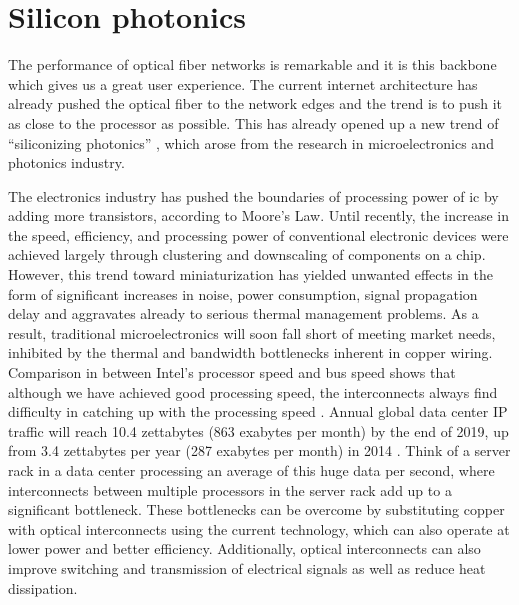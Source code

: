 \documentclass[../report.tex]{subfiles}
\begin{document}
	\section{Silicon photonics}
The performance of optical fiber networks is remarkable and it is this backbone which gives us a great user experience. The current internet architecture has already pushed the optical fiber to the network edges and the trend is to push it as close to the processor as possible. This has already opened up a new trend of “siliconizing photonics” \cite{silicon_photonics}, which arose from the research in microelectronics and photonics industry.\par 
The electronics industry has pushed the boundaries of processing power of \gls{ic} by adding more transistors, according to Moore’s Law. Until recently, the increase in the speed, efficiency, and processing power of conventional electronic devices were achieved largely through clustering and downscaling of components on a chip. However, this trend toward miniaturization has yielded unwanted effects in the form of significant increases in noise, power consumption, signal propagation delay and aggravates already to serious thermal management problems. As a result, traditional microelectronics will soon fall short of meeting market needs, inhibited by the thermal and bandwidth bottlenecks inherent in copper wiring. Comparison in between Intel's processor speed and bus speed shows that although we have achieved good processing speed, the interconnects always find difficulty in catching up with the processing speed \cite{intel_proc_compare}. Annual global data center IP traffic will reach 10.4 zettabytes (863 exabytes per month) by the end of 2019, up from 3.4 zettabytes per year (287 exabytes per month) in 2014 \cite{cisco_forecast_2019}. Think of a server rack in a data center processing an average of this huge data per second, where interconnects between multiple processors in the server rack add up to a significant bottleneck. These bottlenecks can be overcome by substituting copper with optical interconnects using the current technology, which can also operate at lower power and better efficiency. Additionally, optical interconnects can also improve switching and transmission of electrical signals as well as reduce heat dissipation.\par
\end{document}
